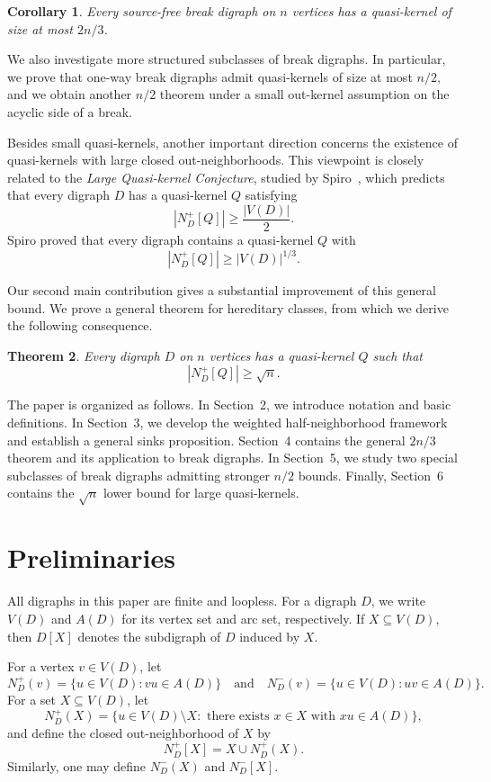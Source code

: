 \documentclass[11pt,a4paper]{article}
\newtheorem{theorem}{Theorem}[section]
\newtheorem{corollary}[theorem]{Corollary}
\begin{document}
\begin{corollary}
Every source-free break digraph on \(n\) vertices has a quasi-kernel of size at
most \(2n/3\).
\end{corollary}

We also investigate more structured subclasses of break digraphs. In
particular, we prove that one-way break digraphs admit quasi-kernels of size at
most \(n/2\), and we obtain another \(n/2\) theorem under a small out-kernel
assumption on the acyclic side of a break.

Besides small quasi-kernels, another important direction concerns the existence
of quasi-kernels with large closed out-neighborhoods. This viewpoint is closely
related to the \emph{Large Quasi-kernel Conjecture}, studied by
Spiro~\cite{Spiro}, which predicts that every digraph \(D\) has a quasi-kernel
\(Q\) satisfying
\[
|N_D^+[Q]|\ge \frac{|V(D)|}{2}.
\]
Spiro proved that every digraph contains a quasi-kernel \(Q\) with
\[
|N_D^+[Q]|\ge |V(D)|^{1/3}.
\]

Our second main contribution gives a substantial improvement of this general
bound. We prove a general theorem for hereditary classes, from
which we derive the following consequence.

\begin{theorem}
Every digraph \(D\) on \(n\) vertices has a quasi-kernel \(Q\) such that
\[
|N_D^+[Q]|\ge \sqrt n .
\]
\end{theorem}

The paper is organized as follows. In Section~2, we introduce notation and
basic definitions. In Section~3, we develop the weighted half-neighborhood
framework and establish a general sinks proposition. Section~4 contains the
general \(2n/3\) theorem and its application to break digraphs. In Section~5,
we study two special subclasses of break digraphs admitting stronger
\(n/2\) bounds. Finally, Section~6 contains the
\(\sqrt n\) lower bound for large quasi-kernels.
\section{Preliminaries}

All digraphs in this paper are finite and loopless. For a digraph \(D\), we
write \(V(D)\) and \(A(D)\) for its vertex set and arc set, respectively. If
\(X\subseteq V(D)\), then \(D[X]\) denotes the subdigraph of \(D\) induced by
\(X\).

For a vertex \(v\in V(D)\), let
\[
    N_D^+(v)=\{u\in V(D): vu\in A(D)\}
    \quad\text{and}\quad
    N_D^-(v)=\{u\in V(D): uv\in A(D)\}.
\]
For a set \(X\subseteq V(D)\), let
\[
    N_D^+(X)=
    \{u\in V(D)\setminus X:\text{ there exists }x\in X\text{ with }xu\in A(D)\},
\]
and define the closed out-neighborhood of \(X\) by
\[
    N_D^+[X]=X\cup N_D^+(X).
\]
Similarly, one may define \(N_D^-(X)\) and \(N_D^-[X]\).
\end{document}
